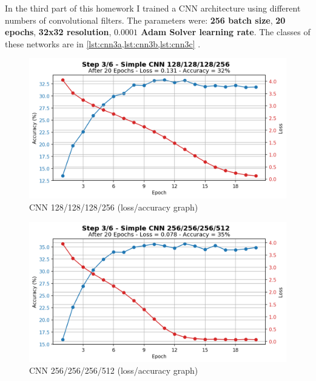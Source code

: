 \documentclass[a4paper, 11pt]{article}
\begin{document}
	In the third part of this homework I trained a CNN architecture using different numbers of convolutional filters. The parameters were: \textbf{256 batch size}, \textbf{20 epochs}, \textbf{32x32 resolution}, \textbf{$\boldsymbol{0.0001}$ Adam Solver learning rate}. The classes of these networks are in \vref{lst:cnn3a,lst:cnn3b,lst:cnn3c} .
	
	
	
	\begin{figure}[ht!]
		\centering
		\includegraphics[width=0.6\paperwidth]{img/fig03a.png}
		\caption{CNN 128/128/128/256 (loss/accuracy graph)}
		\label{fig:03a}
	\end{figure}
	\begin{figure}[ht!]
		\centering
		\includegraphics[width=0.6\paperwidth]{img/fig03b.png}
		\caption{CNN 256/256/256/512 (loss/accuracy graph)}
		\label{fig:03b}
	\end{figure}
\end{document}
